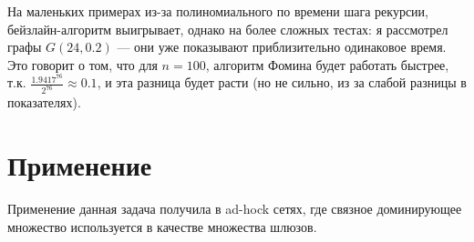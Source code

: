 На маленьких примерах из-за полиномиального по времени шага рекурсии, бейзлайн-алгоритм выигрывает, однако на более сложных тестах: я рассмотрел графы \(G(24, 0.2)\) --- они уже показывают приблизительно одинаковое время. Это говорит о том, что для \(n = 100\), алгоритм Фомина будет работать быстрее, т.к. \(\frac{1.9417^{76}}{2^{76}} \approx 0.1\), и эта разница будет расти (но не сильно, из за слабой разницы в показателях).

\section{Применение}

Применение данная задача получила в ad-hock сетях, где связное доминирующее множество используется в качестве множества шлюзов. \cite{wu}

\printbibliography

 
